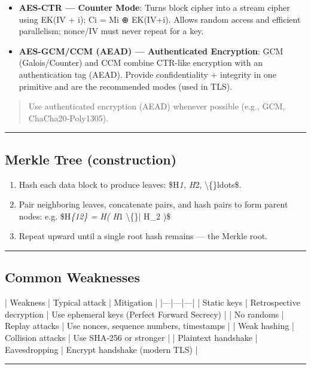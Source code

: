 \documentclass{article}
\begin{document}
\begin{itemize}
  \item \textbf{AES-CTR — Counter Mode}: Turns block cipher into a stream cipher using EK(IV + i); Ci = Mi ⊕ EK(IV+i). Allows random access and efficient parallelism; nonce/IV must never repeat for a key.
\end{itemize}

\begin{itemize}
  \item \textbf{AES-GCM/CCM (AEAD) — Authenticated Encryption}: GCM (Galois/Counter) and CCM combine CTR-like encryption with an authentication tag (AEAD). Provide confidentiality + integrity in one primitive and are the recommended modes (used in TLS).
\end{itemize}

\begin{quote}
Use authenticated encryption (AEAD) whenever possible (e.g., GCM, ChaCha20‑Poly1305).
\end{quote}

\hrule

\subsection{Merkle Tree (construction)}
\begin{enumerate}
  \item Hash each data block to produce leaves: \$H\textit{1, H}2, \textbackslash\{\}ldots\$.
  \item Pair neighboring leaves, concatenate pairs, and hash pairs to form parent nodes: e.g. \$H\textit{\{12\} = H( H}1 \textbackslash\{\}| H_2 )\$
  \item Repeat upward until a single root hash remains — the Merkle root.
\end{enumerate}

\hrule

\subsection{Common Weaknesses}
| Weakness | Typical attack | Mitigation |
|---|---|---|
| Static keys | Retrospective decryption | Use ephemeral keys (Perfect Forward Secrecy) |
| No randoms | Replay attacks | Use nonces, sequence numbers, timestamps |
| Weak hashing | Collision attacks | Use SHA‑256 or stronger |
| Plaintext handshake | Eavesdropping | Encrypt handshake (modern TLS) |

\hrule
\end{document}
